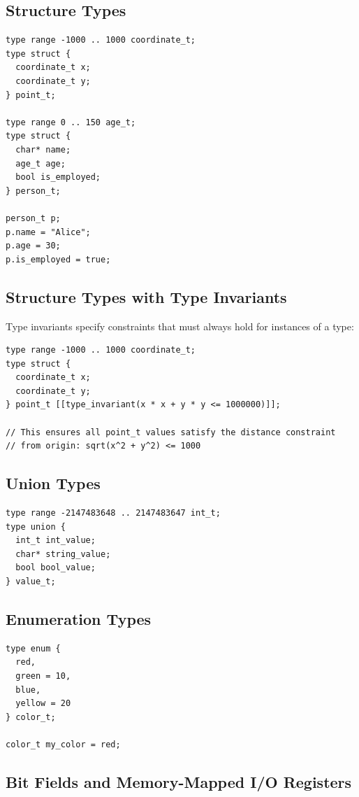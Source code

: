 \documentclass[11pt,letterpaper,twoside,openany]{book}
\begin{document}
\subsection{Structure Types}
\begin{lstlisting}
type range -1000 .. 1000 coordinate_t;
type struct {
  coordinate_t x;
  coordinate_t y;
} point_t;

type range 0 .. 150 age_t;
type struct {
  char* name;
  age_t age;
  bool is_employed;
} person_t;

person_t p;
p.name = "Alice";
p.age = 30;
p.is_employed = true;
\end{lstlisting}

\subsection{Structure Types with Type Invariants}

Type invariants specify constraints that must always hold for instances of a type:

\begin{lstlisting}
type range -1000 .. 1000 coordinate_t;
type struct {
  coordinate_t x;
  coordinate_t y;
} point_t [[type_invariant(x * x + y * y <= 1000000)]];

// This ensures all point_t values satisfy the distance constraint
// from origin: sqrt(x^2 + y^2) <= 1000
\end{lstlisting}

\subsection{Union Types}
\begin{lstlisting}
type range -2147483648 .. 2147483647 int_t;
type union {
  int_t int_value;
  char* string_value;
  bool bool_value;
} value_t;
\end{lstlisting}

\subsection{Enumeration Types}
\begin{lstlisting}
type enum {
  red,
  green = 10,
  blue,
  yellow = 20
} color_t;

color_t my_color = red;
\end{lstlisting}

\subsection{Bit Fields and Memory-Mapped I/O Registers}
\end{document}
